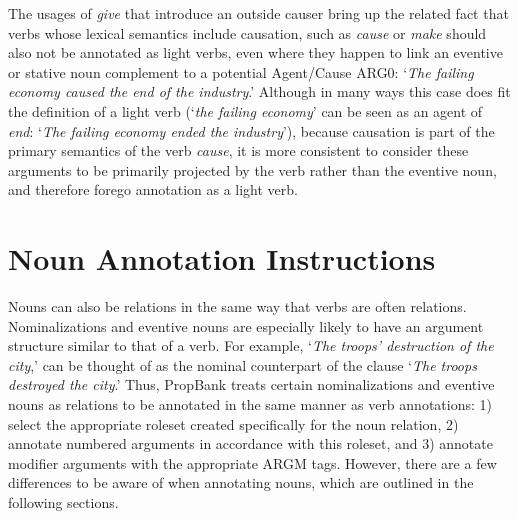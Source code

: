 \documentclass[11pt]{report}
\begin{document}
The usages of \textit{give} that introduce an outside causer bring up the related fact that verbs whose lexical semantics include causation, such as \textit{cause} or \textit{make} should also not be annotated as light verbs, even where they happen to link an eventive or stative noun complement to a potential Agent/Cause ARG0: `\textit{The failing economy caused the end of the industry}.'  Although in many ways this case does fit the definition of a light verb (`\textit{the failing economy}' can be seen as an agent of \textit{end}: `\textit{The failing economy ended the industry}'), because causation is part of the primary semantics of the verb \textit{cause}, it is more consistent to consider these arguments to be primarily projected by the verb rather than the eventive noun, and therefore forego annotation as a light verb. 

\chapter{Noun Annotation Instructions}
\label{chap: Noun Annotation Instructions}
Nouns can also be relations in the same way that verbs are often relations.  Nominalizations and eventive nouns are especially likely to have an argument structure similar to that of a verb.  For example, `\textit{The troops' destruction of the city},'  can be thought of as the nominal counterpart of the clause `\textit{The troops destroyed the city}.'  Thus, PropBank treats certain nominalizations and eventive nouns as relations to be annotated in the same manner as verb annotations: 1) select the appropriate roleset created specifically for the noun relation, 2) annotate numbered arguments in accordance with this roleset, and 3) annotate modifier arguments with the appropriate ARGM tags.  However, there are a few differences to be aware of when annotating nouns, which are outlined in the following sections.  
\end{document}
